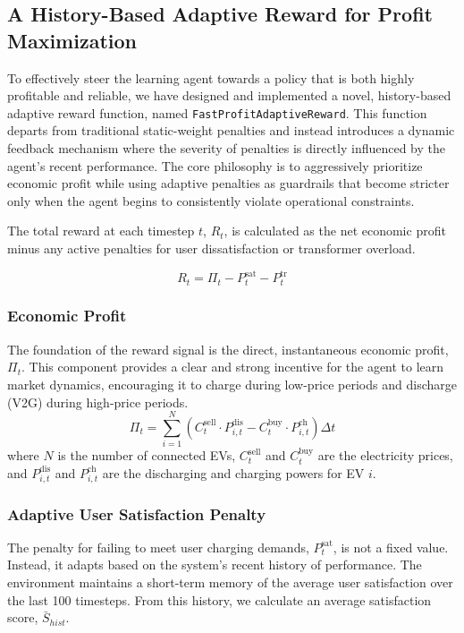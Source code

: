 \subsection{A History-Based Adaptive Reward for Profit Maximization}
\label{sec:adaptive_reward}

To effectively steer the learning agent towards a policy that is both highly profitable and reliable, we have designed and implemented a novel, history-based adaptive reward function, named \texttt{FastProfitAdaptiveReward}. This function departs from traditional static-weight penalties and instead introduces a dynamic feedback mechanism where the severity of penalties is directly influenced by the agent's recent performance. The core philosophy is to aggressively prioritize economic profit while using adaptive penalties as guardrails that become stricter only when the agent begins to consistently violate operational constraints.

The total reward at each timestep $t$, $R_t$, is calculated as the net economic profit minus any active penalties for user dissatisfaction or transformer overload.

\begin{equation}
    R_t = \Pi_t - P_t^{\text{sat}} - P_t^{\text{tr}}
\end{equation}

\subsubsection{Economic Profit}
The foundation of the reward signal is the direct, instantaneous economic profit, $\Pi_t$. This component provides a clear and strong incentive for the agent to learn market dynamics, encouraging it to charge during low-price periods and discharge (V2G) during high-price periods.
\begin{equation}
    \Pi_t = \sum_{i=1}^{N} \left( C_t^{\text{sell}} \cdot P_{i,t}^{\text{dis}} - C_t^{\text{buy}} \cdot P_{i,t}^{\text{ch}} \right) \Delta t
\end{equation}
where $N$ is the number of connected EVs, $C_t^{\text{sell}}$ and $C_t^{\text{buy}}$ are the electricity prices, and $P_{i,t}^{\text{dis}}$ and $P_{i,t}^{\text{ch}}$ are the discharging and charging powers for EV $i$.

\subsubsection{Adaptive User Satisfaction Penalty}
The penalty for failing to meet user charging demands, $P_t^{\text{sat}}$, is not a fixed value. Instead, it adapts based on the system's recent history of performance. The environment maintains a short-term memory of the average user satisfaction over the last 100 timesteps. From this history, we calculate an average satisfaction score, $\bar{S}_{hist}$.

